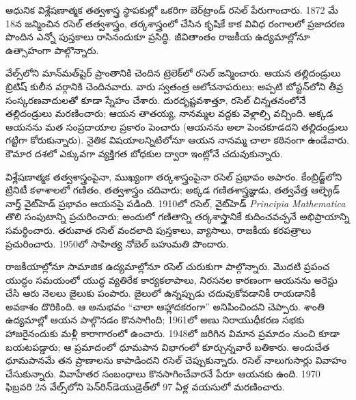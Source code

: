 \documentclass[../../../include/open-logic-section]{subfiles}
\begin{document}



ఆధునిక విశ్లేషణాత్మక తత్వశాస్త్ర స్థాపకుల్లో ఒకరిగా బెర్‌ట్రాండ్ రసెల్ పేరుగాంచారు. 1872 మే 18న జన్మించిన రసెల్ తత్వశాస్త్రం, తర్కశాస్త్రంలో చేసిన కృషికే కాక వివిధ రంగాలలో ప్రజాదరణ పొందిన ఎన్నో పుస్తకాలు రాసినందుకూ ప్రసిద్ధి. జీవితాంతం రాజకీయ ఉద్యమాల్లోనూ ఉత్సాహంగా పాల్గొన్నారు.

వేల్స్‌లోని మాన్‌మత్‌షైర్ ప్రాంతానికి చెందిన ట్రెలెక్‌లో రసెల్ జన్మించారు. ఆయన తల్లిదండ్రులు బ్రిటిష్ కులీన వర్గానికి చెందినవారు. వారు స్వతంత్ర ఆలోచనాపరులు; అప్పటి బోస్టన్‌లోని తీవ్ర సంస్కరణవాదులతో కూడా స్నేహం చేశారు. దురదృష్టవశాత్తూ, రసెల్ చిన్నతనంలోనే తల్లిదండ్రులు మరణించారు; ఆయన తాతయ్య, నానమ్మల వద్దకు వెళ్లాల్సి వచ్చింది. అక్కడ ఆయనను మత సంప్రదాయాల ప్రకారం పెంచారు (ఆయనను అలా పెంచకూడదని తల్లిదండ్రులు గట్టిగా కోరుకున్నారు). నైతిక విషయాలన్నిటిలోనూ ఆయన నానమ్మ చాలా కఠినంగా ఉండేవారు. కౌమార దశలో ఎక్కువగా వ్యక్తిగత బోధకుల ద్వారా ఇంట్లోనే చదువుకున్నారు.

విశ్లేషణాత్మక తత్వశాస్త్రంపైనా, ముఖ్యంగా తర్కశాస్త్రంపైనా రసెల్ ప్రభావం అపారం. కేంబ్రిడ్జ్‌లోని ట్రినిటీ కళాశాలలో గణితం, తత్వశాస్త్రం చదివారు; అక్కడ గణితశాస్త్రజ్ఞుడు, తత్వవేత్త ఆల్ఫ్రెడ్ నార్త్ వైట్‌హెడ్ ప్రభావం ఆయనపై పడింది. 1910లో రసెల్, వైట్‌హెడ్ \emph{Principia Mathematica} తొలి సంపుటాన్ని ప్రచురించారు; అందులో గణితాన్ని తర్కశాస్త్రానికే కుదించవచ్చనే అభిప్రాయాన్ని సమర్థించారు. తరువాత రసెల్ వందలాది పుస్తకాలు, వ్యాసాలు, రాజకీయ కరపత్రాలు ప్రచురించారు. 1950లో సాహిత్య నోబెల్ బహుమతి పొందారు.

రాజకీయాల్లోనూ సామాజిక ఉద్యమాల్లోనూ రసెల్ చురుకుగా పాల్గొన్నారు. మొదటి ప్రపంచ యుద్ధం సమయంలో యుద్ధ వ్యతిరేక కార్యకలాపాలు, నిరసనల కారణంగా ఆయనను అరెస్టు చేసి ఆరు నెలలు జైలుకు పంపారు. జైలులో ఉన్నప్పుడు చదువుకోవడానికీ రాయడానికీ అవకాశం దొరికింది. ఆ అనుభవం ``చాలా ఆహ్లాదకరంగా'' అనిపించిందని చెప్పారు. శాంతి ఉద్యమాల్లో ఆయన పాల్గొనడం కొనసాగింది; 1961లో అణు నిరాయుధీకరణ సభకు హాజరైనందుకు మళ్లీ కారాగారంలో ఉంచారు. 1948లో జరిగిన విమాన ప్రమాదం నుంచి కూడా బయటపడ్డారు; ఆ ప్రమాదంలో ధూమపాన విభాగంలో కూర్చున్నవారే బతికారు. అందుచేత ధూమపానమే తన ప్రాణాలను కాపాడిందని రసెల్ చెప్పుకున్నారు. రసెల్ నాలుగుసార్లు వివాహం చేసుకున్నారు. వివాహేతర సంబంధాలు కొనసాగించేవారనే పేరూ ఆయనకు ఉంది. 1970 ఫిబ్రవరి 2న వేల్స్‌లోని పెన్‌రిన్‌డెయుడ్రెత్‌లో 97 ఏళ్ల వయసులో మరణించారు.
\end{document}
